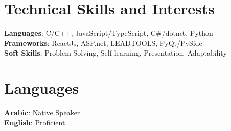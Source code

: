 \documentclass[a4paper,11pt]{article}
\makeatletter
\newcommand{\resumePOR}[3]{
\vspace{0.5mm}\item
    \begin{tabular*}{0.97\textwidth}[t]{l@{\extracolsep{\fill}}r}
        \textbf{#1}\hspace{0.3mm}#2 & \textit{\small{#3}} 
    \end{tabular*}
    \vspace{-2mm}
}
\newcommand{\resumeSubHeadingListStart}{\begin{itemize}[leftmargin=*,labelsep=0mm]}
\newcommand{\resumeSubHeadingListEnd}{\end{itemize}\vspace{2mm}}
\makeatother
\begin{document}
\section{\textbf{Technical Skills and Interests}}
 \begin{itemize}[leftmargin=0.05in, label={}]
    \small{\item{
     \textbf{Languages}{: C/C++, JavaScript/TypeScript, C\#/dotnet, Python}\\
     \textbf{Frameworks}{: ReactJs, ASP.net, LEADTOOLS, PyQt/PySide }\\ 
     \textbf{Soft Skills}{: Problem Solving, Self-learning, Presentation, Adaptability} \\
    }}
 \end{itemize}
 \vspace{-16pt}





\section{\textbf{Languages}}
 \begin{itemize}[leftmargin=0.05in, label={}]
    \small{\item{
     \textbf{Arabic}{: Native Speaker }\\ 
     \textbf{English}{: Proficient }\\
    }}
 \end{itemize}
 \vspace{-16pt}




    



\end{document}
